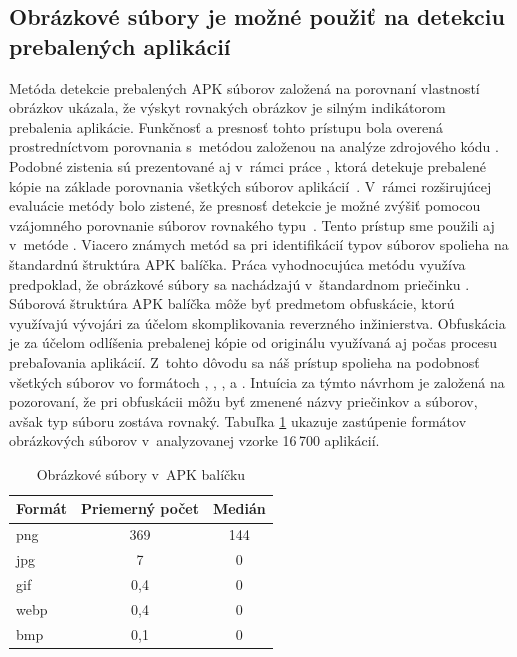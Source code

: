 \subsection*{Obrázkové súbory je možné použiť na detekciu prebalených aplikácií}
Metóda detekcie prebalených APK súborov  založená na porovnaní vlastností obrázkov ukázala, že výskyt rovnakých obrázkov je silným indikátorom prebalenia aplikácie. Funkčnosť a presnosť tohto prístupu bola overená prostredníctvom porovnania s~metódou založenou na analýze zdrojového kódu \cite{ImageStruct}. Podobné zistenia sú prezentované aj v~rámci práce , ktorá detekuje prebalené kópie na základe porovnania všetkých súborov aplikácií~\cite{Zhauniarovich2014}. V~rámci rozširujúcej evaluácie metódy  bolo zistené, že presnosť detekcie je možné zvýšiť pomocou vzájomného porovnanie súborov rovnakého typu~\cite{Gadyatskaya2016}. Tento prístup sme použili aj v~metóde . Viacero známych metód sa pri identifikácií typov súborov spolieha na štandardnú štruktúra APK balíčka. Práca vyhodnocujúca metódu  využíva predpoklad, že obrázkové súbory sa nachádzajú v~štandardnom priečinku . Súborová štruktúra APK balíčka môže byť predmetom obfuskácie, ktorú využívajú vývojári za účelom skomplikovania reverzného inžinierstva. Obfuskácia je za účelom odlíšenia prebalenej kópie od originálu využívaná aj počas procesu prebaľovania aplikácií. Z~tohto dôvodu sa náš prístup spolieha na podobnosť všetkých súborov vo formátoch , , ,  a . Intuícia za týmto návrhom je založená na pozorovaní, že pri obfuskácii môžu byť zmenené názvy priečinkov a súborov, avšak typ súboru zostáva rovnaký. Tabuľka \ref{images-apk} ukazuje zastúpenie formátov obrázkových súborov v~analyzovanej vzorke 16\,700 aplikácií.
\begin{table}[]
\centering
\begin{tabular}{|l c c|}
\hline
\textbf{Formát} & \textbf{Priemerný počet}  & \textbf{Medián}         \\ \hline
png             & 369                       & 144         \\
jpg             & 7                         & 0                 \\
gif             & 0,4                       & 0             \\
webp            & 0,4                       & 0         \\
bmp             & 0,1                       & 0         \\
\hline
\end{tabular}
\caption{Obrázkové súbory v~APK balíčku}
\label{images-apk}
\end{table}

